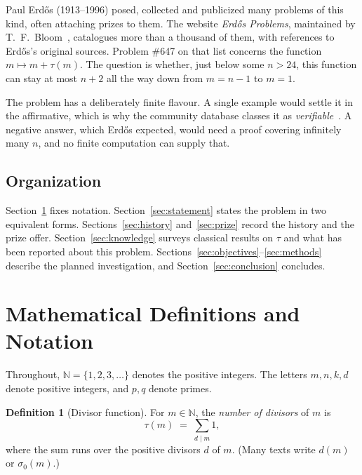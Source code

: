 \documentclass[11pt]{amsart}
\theoremstyle{plain}
\theoremstyle{definition}
\newtheorem{definition}[theorem]{Definition}
\theoremstyle{remark}
\numberwithin{equation}{section}
\newcommand{\N}{\mathbb{N}}
\begin{document}
Paul Erd\H{o}s (1913--1996) posed, collected and publicized many problems of this kind, often attaching prizes to them. The website \emph{Erd\H{o}s Problems}, maintained by T.~F.~Bloom~\cite{Bloom647,BloomFAQ}, catalogues more than a thousand of them, with references to Erd\H{o}s's original sources. Problem \#647 on that list concerns the function $m\mapsto m+\tau(m)$. The question is whether, just below some $n>24$, this function can stay at most $n+2$ all the way down from $m=n-1$ to $m=1$.

The problem has a deliberately finite flavour. A single example would settle it in the affirmative, which is why the community database classes it as \emph{verifiable}~\cite{TeorthDatabase}. A negative answer, which Erd\H{o}s expected, would need a proof covering infinitely many $n$, and no finite computation can supply that.

\subsection*{Organization}
Section~\ref{sec:notation} fixes notation. Section~\ref{sec:statement} states the problem in two equivalent forms. Sections~\ref{sec:history} and~\ref{sec:prize} record the history and the prize offer. Section~\ref{sec:knowledge} surveys classical results on $\tau$ and what has been reported about this problem. Sections~\ref{sec:objectives}--\ref{sec:methods} describe the planned investigation, and Section~\ref{sec:conclusion} concludes.

\section{Mathematical Definitions and Notation}\label{sec:notation}

Throughout, $\N=\{1,2,3,\dots\}$ denotes the positive integers. The letters $m,n,k,d$ denote positive integers, and $p,q$ denote primes.

\begin{definition}[Divisor function]\label{def:tau}
For $m\in\N$, the \emph{number of divisors} of $m$ is
\begin{equation}\label{eq:tau}
  \tau(m) \;=\; \sum_{d\mid m} 1,
\end{equation}
where the sum runs over the positive divisors $d$ of $m$. (Many texts write $d(m)$ or $\sigma_0(m)$.)
\end{definition}
\end{document}
